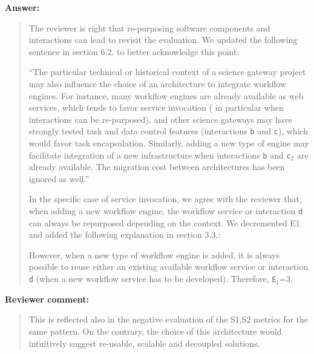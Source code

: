 \documentclass[a4]{article}
\newenvironment{review}%
{\textbf{Reviewer comment:}\begin{quote}}%
{\end{quote}}%
\newenvironment{answer}%
{\textbf{Answer:}\begin{small}\begin{quote}}%
{\end{quote}\end{small}}%
\newcommand{\revised}[1]{\color{blue} #1\color{black}\xspace}
\begin{document}
\begin{answer}

The reviewer is right that re-purposing software components
  and interactions can lead to revisit the evaluation. We updated the following sentence in section 6.2. to better acknowledge this point:

``The particular technical or historical context of a science gateway
project may also influence the choice of an architecture to
integrate workflow engines. For instance, many workflow engines are
already available as web services, which tends to favor service
invocation (\revised{in particular when interactions can be re-purposed}), and other science gateways may have strongly tested task
and data control features (interactions \texttt{b} and \texttt{c}),
which would favor task encapsulation. Similarly, adding a new type of engine
may facilitate integration of a new infrastructure when interactions
\texttt{b} and \texttt{c$_2$} are already available. The migration
cost between architectures has been ignored as well.''

In the specific case of service invocation, we agree with the reviewer
that, when adding a new workflow engine, the workflow service or interaction \texttt{d} can always be repurposed depending on the context. We decremented E1 and added the following explanation in section 3.3.:

\revised{However, when a new type of workflow engine is added, it is always possible to reuse either an existing available workflow service or interaction \texttt{d} (when a new workflow service has to be developed). Therefore, \texttt{E$_1$}=3}.
\end{answer}

\begin{review}
 This is reflected also in the negative evaluation of the S1,S2 metrics for the same pattern. On the contrary, the choice of this architecture would intuitively suggest re-usable, scalable and decoupled solutions.
\end{review}
\end{document}
